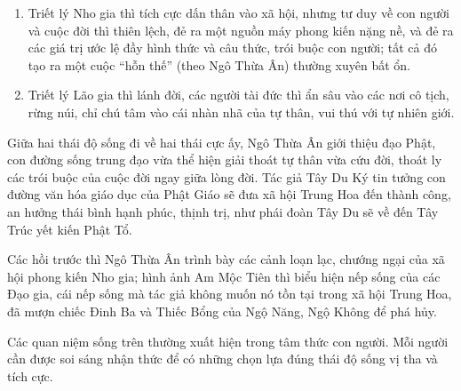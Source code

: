 \begin{enumerate}[label=\itshape\alph*\upshape/]
    \item Triết lý Nho gia thì tích cực dấn thân vào xã hội, nhưng tư duy về con người và cuộc đời thì thiên lệch, đẻ ra một nguồn máy phong kiến nặng nề, và đẻ ra các giá trị ước lệ đầy hình thức và câu thức, trói buộc con người; tất cả đó tạo ra một cuộc ``hỗn thế'' (theo Ngô Thừa Ân) thường xuyên bất ổn.

    \item Triết lý Lão gia thì lánh đời, các người tài đức thì ẩn sâu vào các nơi cô tịch, rừng núi, chỉ chú tâm vào cái nhàn nhã của tự thân, vui thú với tự nhiên giới.
\end{enumerate}

Giữa hai thái độ sống đi về hai thái cực ấy, Ngô Thừa Ân giới thiệu đạo Phật, con đường sống trung đạo vừa thể hiện giải thoát tự thân vừa cứu đời, thoát ly các trói buộc của cuộc đời ngay giữa lòng đời. Tác giả Tây Du Ký tin tưởng con đường văn hóa giáo dục của Phật Giáo sẽ đưa xã hội Trung Hoa đến thành công, an hưởng thái bình hạnh phúc, thịnh trị, như phái đoàn Tây Du sẽ về đến Tây Trúc yết kiến Phật Tổ.

Các hồi trước thì Ngô Thừa Ân trình bày các cảnh loạn lạc, chướng ngại của xã hội phong kiến Nho gia; hình ảnh Am Mộc Tiên thì biểu hiện nếp sống của các Đạo gia, cái nếp sống mà tác giả không muốn nó tồn tại trong xã hội Trung Hoa, đã mượn chiếc Đinh Ba và Thiếc Bổng của Ngộ Năng, Ngộ Không để phá hủy.

Các quan niệm sống trên thường xuất hiện trong tâm thức con người. Mỗi người cần được soi sáng nhận thức để có những chọn lựa đúng thái độ sống vị tha và tích cực.
